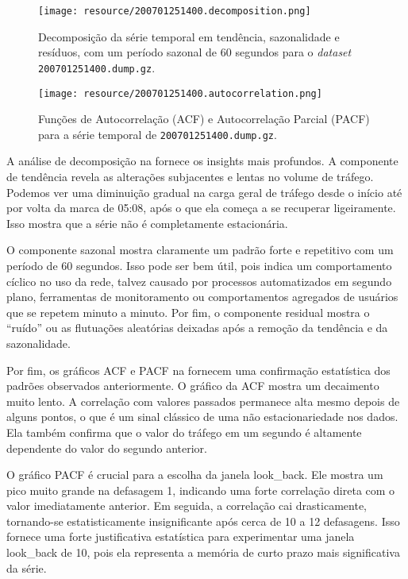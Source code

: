 \begin{figure}[!htb]
    \centering
    \texttt{[image: resource/200701251400.decomposition.png]}
    \caption{Decomposição da série temporal em tendência, sazonalidade e resíduos, com um período sazonal de
    60 segundos para o \emph{dataset} \texttt{200701251400.dump.gz}.}
    \label{fig:eda-decomposition}
\end{figure}

\begin{figure}[!htb]
    \centering
    \texttt{[image: resource/200701251400.autocorrelation.png]}
    \caption{Funções de Autocorrelação (ACF) e Autocorrelação Parcial (PACF) para a série temporal de
    \texttt{200701251400.dump.gz}.}
    \label{fig:eda-acf-pacf}
\end{figure}

A análise de decomposição na  fornece os insights mais profundos. A componente de
tendência revela as alterações subjacentes e lentas no volume de tráfego. Podemos ver uma diminuição gradual
na carga geral de tráfego desde o início até por volta da marca de 05:08, após o que ela começa a se
recuperar ligeiramente. Isso mostra que a série não é completamente estacionária.

O componente sazonal mostra claramente um padrão forte e repetitivo com um período de 60 segundos. Isso pode
ser bem útil, pois indica um comportamento cíclico no uso da rede, talvez causado por processos automatizados
em segundo plano, ferramentas de monitoramento ou comportamentos agregados de usuários que se repetem minuto
a minuto. Por fim, o componente residual mostra o ``ruído'' ou as flutuações aleatórias deixadas após a
remoção da tendência e da sazonalidade.

Por fim, os gráficos ACF e PACF na  fornecem uma confirmação estatística dos padrões
observados anteriormente.
O gráfico da ACF mostra um decaimento muito lento. A correlação com valores passados permanece alta mesmo
depois de alguns pontos, o que é um sinal clássico de uma não estacionariedade nos dados. Ela também confirma
que o valor do tráfego em um segundo é altamente dependente do valor do segundo anterior.

O gráfico PACF é crucial para a escolha da janela look_back. Ele mostra um pico muito grande na defasagem 1,
indicando uma forte correlação direta com o valor imediatamente anterior. Em seguida, a correlação cai
drasticamente, tornando-se estatisticamente insignificante após cerca de 10 a 12 defasagens. Isso fornece uma
forte justificativa estatística para experimentar uma janela look_back de 10, pois ela representa a memória
de curto prazo mais significativa da série.

